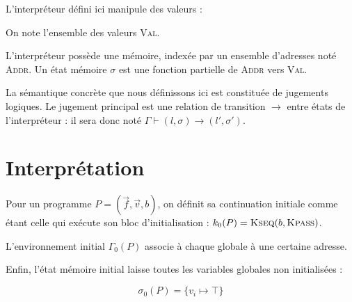 L'interpréteur défini ici manipule des valeurs :


On note l'ensemble des valeurs \textsc{Val}.

\begin{definition}
L'interpréteur possède une mémoire, indexée par un ensemble d'adresses noté
\textsc{Addr}. Un état mémoire $σ$ est une fonction partielle de \textsc{Addr}
vers \textsc{Val}.
\end{definition}


\begin{definition}
La sémantique concrète que nous définissons ici est constituée de jugements
logiques. Le jugement principal est une relation de transition $\rightarrow$
entre états de l'interpréteur : il sera donc noté $Γ ⊢ (l, σ) \rightarrow (l', σ')$.
\end{definition}

\section{Interprétation}

\begin{definition}

  Pour un programme $P = (\vec{f},\vec{v},b)$, on définit sa continuation
  initiale comme étant celle qui exécute son bloc d'initialisation : $k_0 (P) =
  \textsc{Kseq}(b, \textsc{Kpass})$.

  L'environnement initial $Γ_0(P)$ associe à chaque globale à une certaine
  adresse.

  Enfin, l'état mémoire initial laisse toutes les variables globales non
  initialisées :

  \[ σ_0(P) = \{ v_i ↦ \top \} \]

\end{definition}

